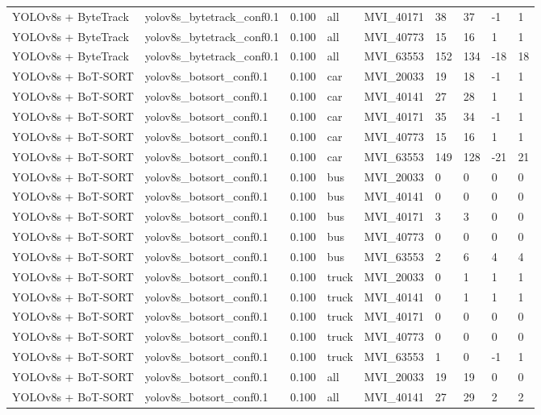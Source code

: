 \begin{tabular}{lllllllll}
YOLOv8s + ByteTrack & yolov8s\_bytetrack\_conf0.1 & 0.100 & all & MVI\_40171 & 38 & 37 & -1 & 1 \\
YOLOv8s + ByteTrack & yolov8s\_bytetrack\_conf0.1 & 0.100 & all & MVI\_40773 & 15 & 16 & 1 & 1 \\
YOLOv8s + ByteTrack & yolov8s\_bytetrack\_conf0.1 & 0.100 & all & MVI\_63553 & 152 & 134 & -18 & 18 \\
YOLOv8s + BoT-SORT & yolov8s\_botsort\_conf0.1 & 0.100 & car & MVI\_20033 & 19 & 18 & -1 & 1 \\
YOLOv8s + BoT-SORT & yolov8s\_botsort\_conf0.1 & 0.100 & car & MVI\_40141 & 27 & 28 & 1 & 1 \\
YOLOv8s + BoT-SORT & yolov8s\_botsort\_conf0.1 & 0.100 & car & MVI\_40171 & 35 & 34 & -1 & 1 \\
YOLOv8s + BoT-SORT & yolov8s\_botsort\_conf0.1 & 0.100 & car & MVI\_40773 & 15 & 16 & 1 & 1 \\
YOLOv8s + BoT-SORT & yolov8s\_botsort\_conf0.1 & 0.100 & car & MVI\_63553 & 149 & 128 & -21 & 21 \\
YOLOv8s + BoT-SORT & yolov8s\_botsort\_conf0.1 & 0.100 & bus & MVI\_20033 & 0 & 0 & 0 & 0 \\
YOLOv8s + BoT-SORT & yolov8s\_botsort\_conf0.1 & 0.100 & bus & MVI\_40141 & 0 & 0 & 0 & 0 \\
YOLOv8s + BoT-SORT & yolov8s\_botsort\_conf0.1 & 0.100 & bus & MVI\_40171 & 3 & 3 & 0 & 0 \\
YOLOv8s + BoT-SORT & yolov8s\_botsort\_conf0.1 & 0.100 & bus & MVI\_40773 & 0 & 0 & 0 & 0 \\
YOLOv8s + BoT-SORT & yolov8s\_botsort\_conf0.1 & 0.100 & bus & MVI\_63553 & 2 & 6 & 4 & 4 \\
YOLOv8s + BoT-SORT & yolov8s\_botsort\_conf0.1 & 0.100 & truck & MVI\_20033 & 0 & 1 & 1 & 1 \\
YOLOv8s + BoT-SORT & yolov8s\_botsort\_conf0.1 & 0.100 & truck & MVI\_40141 & 0 & 1 & 1 & 1 \\
YOLOv8s + BoT-SORT & yolov8s\_botsort\_conf0.1 & 0.100 & truck & MVI\_40171 & 0 & 0 & 0 & 0 \\
YOLOv8s + BoT-SORT & yolov8s\_botsort\_conf0.1 & 0.100 & truck & MVI\_40773 & 0 & 0 & 0 & 0 \\
YOLOv8s + BoT-SORT & yolov8s\_botsort\_conf0.1 & 0.100 & truck & MVI\_63553 & 1 & 0 & -1 & 1 \\
YOLOv8s + BoT-SORT & yolov8s\_botsort\_conf0.1 & 0.100 & all & MVI\_20033 & 19 & 19 & 0 & 0 \\
YOLOv8s + BoT-SORT & yolov8s\_botsort\_conf0.1 & 0.100 & all & MVI\_40141 & 27 & 29 & 2 & 2 \\

\end{tabular}
